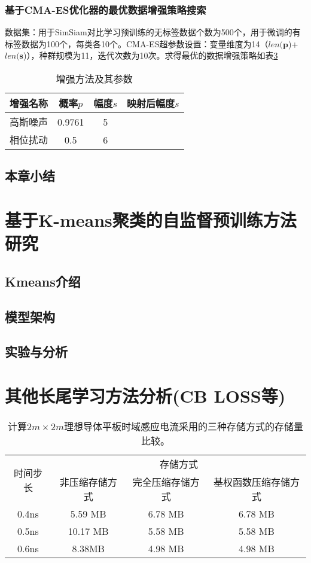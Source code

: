 \documentclass[master]{thesis-uestc}
\begin{document}
\subsection{基于CMA-ES优化器的最优数据增强策略搜索}
数据集：用于SimSiam对比学习预训练的无标签数据个数为500个，用于微调的有标签数据为100个，每类各10个。CMA-ES超参数设置：变量维度为14（\(len(\mathbf{p}\))+\(len(\mathbf{s}\))），种群规模为11，迭代次数为10次。求得最优的数据增强策略如表\ref{}
\begin{table}[h]
    \caption{增强方法及其参数}
    \begin{tabular}{cccc}
    \toprule
    增强名称 & 概率$p$ & 幅度$s$ & 映射后幅度$s$\\
    \midrule
    高斯噪声 & 0.9761 & 5 \\
    相位扰动 & 0.5 & 6 \\
    \bottomrule
    \end{tabular}
    \label{tableb}
    \end{table}
\section{本章小结}


\chapter{基于K-means聚类的自监督预训练方法研究}
\section{Kmeans介绍}
\section{模型架构}
\section{实验与分析}

\chapter{其他长尾学习方法分析(CB LOSS等)}

\begin{table}[h]
\caption{计算$2m\times 2m$理想导体平板时域感应电流采用的三种存储方式的存储量比较。}
\begin{tabular}{cccc}
\toprule
\multirow{2}{*}{时间步长} & \multicolumn{3}{c}{存储方式} \\
\cmidrule{2-4}
& 非压缩存储方式 & 完全压缩存储方式 & 基权函数压缩存储方式 \\
\midrule
0.4ns & 5.59 MB & 6.78 MB & 6.78 MB\\
0.5ns & 10.17 MB & 5.58 MB & 5.58 MB \\
0.6ns & 8.38MB & 4.98 MB & 4.98 MB \\
\bottomrule
\end{tabular}
\label{tablea}
\end{table}
\end{document}
